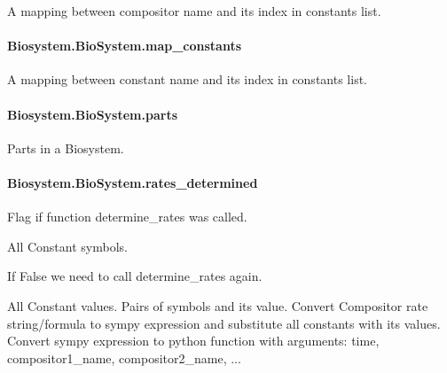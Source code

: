 A mapping between compositor name and its index in {\ttfamily constants} list. 

\paragraph[{\texorpdfstring{map\+\_\+constants}{map_constants}}]{\setlength{\rightskip}{0pt plus 5cm}Biosystem.\+Bio\+System.\+map\+\_\+constants}\hypertarget{classBiosystem_1_1BioSystem_a0b7ed650ff3a0db588b21d55151fbee6}{}\label{classBiosystem_1_1BioSystem_a0b7ed650ff3a0db588b21d55151fbee6}


A mapping between constant name and its index in {\ttfamily constants} list. 

\paragraph[{\texorpdfstring{parts}{parts}}]{\setlength{\rightskip}{0pt plus 5cm}Biosystem.\+Bio\+System.\+parts}\hypertarget{classBiosystem_1_1BioSystem_adc4002931a29601944a3e11191af7707}{}\label{classBiosystem_1_1BioSystem_adc4002931a29601944a3e11191af7707}


Parts in a Biosystem. 

\paragraph[{\texorpdfstring{rates\+\_\+determined}{rates_determined}}]{\setlength{\rightskip}{0pt plus 5cm}Biosystem.\+Bio\+System.\+rates\+\_\+determined}\hypertarget{classBiosystem_1_1BioSystem_a9189d6eb1e1965d9b63cda27e53f08b7}{}\label{classBiosystem_1_1BioSystem_a9189d6eb1e1965d9b63cda27e53f08b7}


Flag if function determine\+\_\+rates was called. 

All Constant symbols.

If False we need to call determine\+\_\+rates again.

All Constant values. Pairs of symbols and its value. Convert Compositor rate string/formula to sympy expression and substitute all constants with its values. Convert sympy expression to python function with arguments\+: time, compositor1\+\_\+name, compositor2\+\_\+name, ... 

